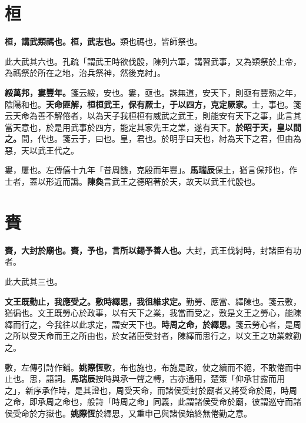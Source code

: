\section{桓}


\textbf{桓，講武類禡也。桓，武志也。}{\footnotesize 類也禡也，皆師祭也。}

\begin{quoting}此大武其六也。孔疏「謂武王時欲伐殷，陳列六軍，講習武事，又為類祭於上帝，為禡祭於所在之地，治兵祭神，然後克紂」。\end{quoting}

\textbf{綏萬邦，婁豐年。}{\footnotesize 箋云綏，安也。婁，亟也。誅無道，安天下，則亟有豐熟之年，陰陽和也。}\textbf{天命匪解，桓桓武王，保有厥士，于以四方，克定厥家。}{\footnotesize 士，事也。箋云天命為善不解倦者，以為天子我桓桓有威武之武王，則能安有天下之事，此言其當天意也，於是用武事於四方，能定其家先王之業，遂有天下。}\textbf{於昭于天，皇以間之。}{\footnotesize 間，代也。箋云于，曰也。皇，君也。於明乎曰天也，紂為天下之君，但由為惡，天以武王代之。}

\begin{quoting}婁，屢也。左傳僖十九年「昔周饑，克殷而年豐」。\textbf{馬瑞辰}保土，猶言保邦也，作士者，蓋以形近而譌。\textbf{陳奐}言武王之德昭著於天，故天以武王代殷也。\end{quoting}

\section{賚}


\textbf{賚，大封於廟也。賚，予也，言所以錫予善人也。}{\footnotesize 大封，武王伐紂時，封諸臣有功者。}

\begin{quoting}此大武其三也。\end{quoting}

\textbf{文王既勤止，我應受之。敷時繹思，我徂維求定。}{\footnotesize 勤勞、應當、繹陳也。箋云敷，猶徧也。文王既勞心於政事，以有天下之業，我當而受之，敷是文王之勞心，能陳繹而行之，今我往以此求定，謂安天下也。}\textbf{時周之命，於繹思。}{\footnotesize 箋云勞心者，是周之所以受天命而王之所由也，於女諸臣受封者，陳繹而思行之，以文王之功業敕勸之。}

\begin{quoting}敷，左傳引詩作鋪。\textbf{姚際恆}敷，布也施也，布施是政，使之續而不絕，不敢倦而中止也。思，語詞。\textbf{馬瑞辰}按時與承一聲之轉，古亦通用，楚策「仰承甘露而用之」，新序承作時，是其證也，周受天命，而諸侯受封於廟者又將受命於周，時周之命，即承周之命也，般詩「時周之命」同義，此謂諸侯受命於廟，彼謂巡守而諸侯受命於方嶽也。\textbf{姚際恆}於繹思，又重申己與諸侯始終無倦勤之意。\end{quoting}

